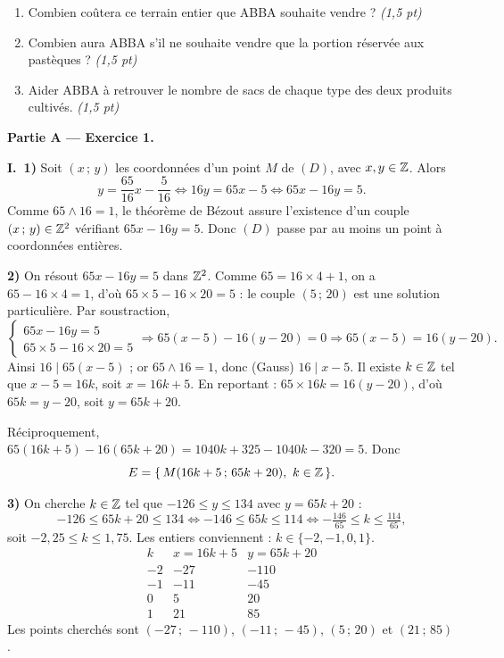 \begin{enumerate}[label=\textbf{Tâche \arabic*.},leftmargin=2.6em]
\item Combien coûtera ce terrain entier que ABBA souhaite vendre ? \hfill\textit{(1,5 pt)}
\item Combien aura ABBA s'il ne souhaite vendre que la portion réservée aux pastèques ? \hfill\textit{(1,5 pt)}
\item Aider ABBA à retrouver le nombre de sacs de chaque type des deux produits cultivés. \hfill\textit{(1,5 pt)}
\end{enumerate}
\par{}


\noindent\textbf{Partie A — Exercice 1.}

\smallskip
\noindent\textbf{I.\ 1)} Soit $(x\,;\,y)$ les coordonnées d'un point $M$ de $(D)$, avec $x,y\in\mathbb{Z}$. Alors
\[
y=\frac{65}{16}x-\frac{5}{16}\iff 16y=65x-5\iff 65x-16y=5 .
\]
Comme $65\wedge16=1$, le théorème de Bézout assure l'existence d'un couple $(x\,;\,y)\in\mathbb{Z}^2$ vérifiant $65x-16y=5$. Donc $(D)$ passe par au moins un point à coordonnées entières.

\noindent\textbf{2)} On résout $65x-16y=5$ dans $\mathbb{Z}^2$. Comme $65=16\times4+1$, on a $65-16\times4=1$, d'où $65\times5-16\times20=5$ : le couple $(5\,;\,20)$ est une solution particulière. Par soustraction,
\[
\begin{cases}65x-16y=5\\65\times5-16\times20=5\end{cases}\Rightarrow 65(x-5)-16(y-20)=0\Rightarrow 65(x-5)=16(y-20).
\]
Ainsi $16\mid 65(x-5)$ ; or $65\wedge16=1$, donc (Gauss) $16\mid x-5$. Il existe $k\in\mathbb{Z}$ tel que $x-5=16k$, soit $x=16k+5$. En reportant : $65\times16k=16(y-20)$, d'où $65k=y-20$, soit $y=65k+20$.

Réciproquement, $65(16k+5)-16(65k+20)=1040k+325-1040k-320=5$. Donc
\[
E=\{\,M(16k+5\,;\,65k+20),\ k\in\Z\,\}.
\]

\noindent\textbf{3)} On cherche $k\in\mathbb{Z}$ tel que $-126\le y\le134$ avec $y=65k+20$ :
\[
-126\le 65k+20\le134\iff -146\le65k\le114\iff -\tfrac{146}{65}\le k\le\tfrac{114}{65},
\]
soit $-2{,}25\le k\le1{,}75$. Les entiers conviennent : $k\in\{-2,-1,0,1\}$.
\[
\begin{array}{c|c|c}
k & x=16k+5 & y=65k+20\\\hline
-2 & -27 & -110\\
-1 & -11 & -45\\
0 & 5 & 20\\
1 & 21 & 85
\end{array}
\]
Les points cherchés sont $(-27\,;\,-110)$, $(-11\,;\,-45)$, $(5\,;\,20)$ et $(21\,;\,85)$.

